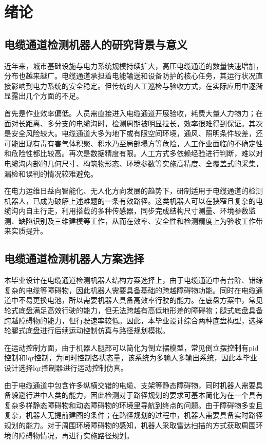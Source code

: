 \chapter{绪论}\label{chap:introduction}

\section{电缆通道检测机器人的研究背景与意义}
近年来，城市基础设施与电力系统规模持续扩大，高压电缆通道的数量快速增加，分布也越来越广。电缆通道承担着电能输送和设备防护的核心任务，其运行状况直接影响到电力系统的安全稳定。但传统的人工巡检与验收方式，在实际应用中逐渐显露出几个方面的不足。

首先是作业效率偏低。人员需直接进入电缆通道开展验收，耗费大量人力物力；在面对长距离、多分支的电缆沟时，检测周期被明显拉长，效率很难得到保证。其次是安全风险较大。电缆通道大多为地下或有限空间环境，通风、照明条件较差，还可能出现有毒有害气体积聚、积水乃至局部塌方等危险，人工作业面临的不确定性和危险性都比较高。再次是数据精度有限。人工方式多依赖经验进行判断，难以对电缆沟内部的几何尺寸、构筑物形态、环境参数等实施高精度、全覆盖式的采集，漏检和误判的情况较难避免。

在电力运维日益向智能化、无人化方向发展的趋势下，研制适用于电缆通道的检测机器人，已成为破解上述难题的一条有效路径。这类机器人可以在狭窄且复杂的电缆沟内自主行走，利用搭载的多种传感器，同步完成结构尺寸测量、环境参数监测、缺陷识别及三维建模等工作，从而在效率、安全性和检测精度上为验收工作带来实质提升。

\section{电缆通道检测机器人方案选择}
本毕业设计在电缆通道检测机器人结构方案选择上，由于电缆通道中有台阶、错综复杂的电缆等障碍物，因此机器人需要具备基础的跨越障碍物功能。同时在电缆通道中不易更换电池，所以需要机器人具备高效率行驶的能力。在底盘方案中，常见轮式底盘满足高效行驶的能力，但无法跨越有高低地形差的障碍物；腿式底盘具备跨越障碍物的能力，但行驶速率较低。因此，本毕业设计综合两种底盘构型，选择轮腿式底盘进行后续运动控制仿真与路径规划模拟。

在运动控制方面，由于机器人腿部可以简化为倒立摆模型，常见倒立摆控制有pid控制和lqr控制，为同时控制各状态量，该系统为多输入多输出系统，因此本毕业设计选择lqr控制器进行运动控制仿真。

由于电缆通道中包含许多纵横交错的电缆、支架等静态障碍物，同时机器人需要具备躲避行进中人类的能力，因此检测对于路径规划的要求可基本简化为在一个具有复杂多样静态障碍物和动态障碍物的环境里导航到终点的问题。由于障碍物多变且复杂，机器人无提前建图的条件；在路径规划的过程中，机器人需要具备实时路径规划的能力。对于周围环境障碍物的感知，机器人采取雷达扫描的方式获取周围环境的障碍物情况，再进行实施路径规划。

